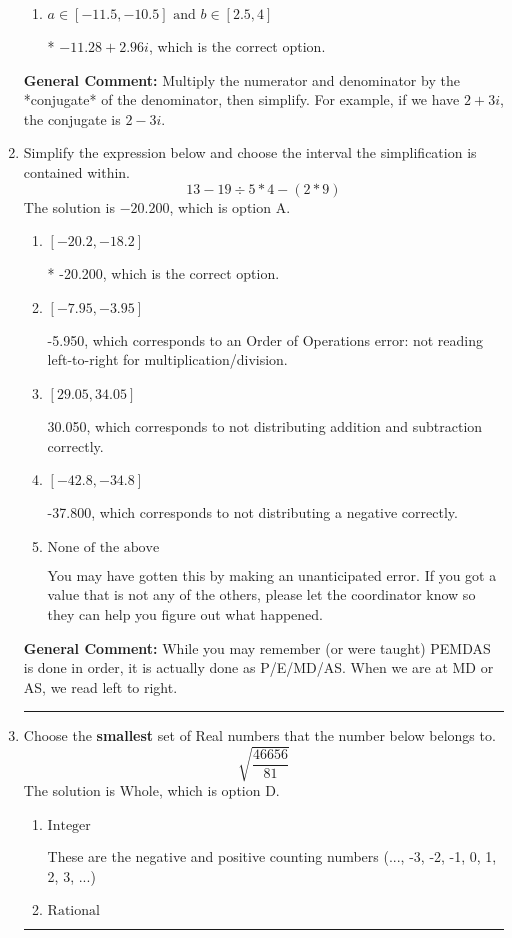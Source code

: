 \documentclass{extbook}[14pt]
\newcommand{\litem}[1]{\item #1

\rule{\textwidth}{0.4pt}}
\begin{document}
\begin{enumerate}
{\begin{enumerate}[label=\Alph*.]
 $-282.00  + 2.96 i$, which corresponds to forgetting to multiply the conjugate by the numerator and using a plus instead of a minus in the denominator.
\item \( a \in [-11.5, -10.5] \text{ and } b \in [2.5, 4] \)

* $-11.28  + 2.96 i$, which is the correct option.
\end{enumerate}

\textbf{General Comment:} Multiply the numerator and denominator by the *conjugate* of the denominator, then simplify. For example, if we have $2+3i$, the conjugate is $2-3i$.
}
\litem{
Simplify the expression below and choose the interval the simplification is contained within.
\[ 13 - 19 \div 5 * 4 - (2 * 9) \]
The solution is \( -20.200 \), which is option A.\begin{enumerate}[label=\Alph*.]
\item \( [-20.2, -18.2] \)

* -20.200, which is the correct option.
\item \( [-7.95, -3.95] \)

 -5.950, which corresponds to an Order of Operations error: not reading left-to-right for multiplication/division.
\item \( [29.05, 34.05] \)

 30.050, which corresponds to not distributing addition and subtraction correctly.
\item \( [-42.8, -34.8] \)

 -37.800, which corresponds to not distributing a negative correctly.
\item \( \text{None of the above} \)

 You may have gotten this by making an unanticipated error. If you got a value that is not any of the others, please let the coordinator know so they can help you figure out what happened.
\end{enumerate}

\textbf{General Comment:} While you may remember (or were taught) PEMDAS is done in order, it is actually done as P/E/MD/AS. When we are at MD or AS, we read left to right.
}
\litem{
Choose the \textbf{smallest} set of Real numbers that the number below belongs to.
\[ \sqrt{\frac{46656}{81}} \]
The solution is \( \text{Whole} \), which is option D.\begin{enumerate}[label=\Alph*.]
\item \( \text{Integer} \)

These are the negative and positive counting numbers (..., -3, -2, -1, 0, 1, 2, 3, ...)
\item \( \text{Rational} \)


\end{enumerate}}
\end{enumerate}
\end{document}
